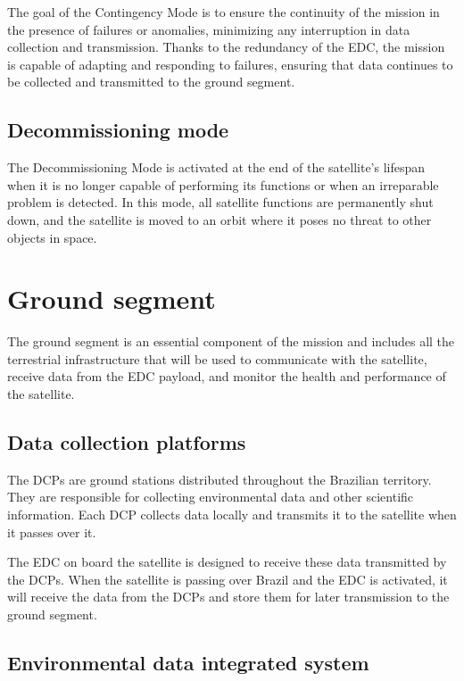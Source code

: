 The goal of the Contingency Mode is to ensure the continuity of the mission in the presence of failures or anomalies, minimizing any interruption in data collection and transmission. Thanks to the redundancy of the EDC, the mission is capable of adapting and responding to failures, ensuring that data continues to be collected and transmitted to the ground segment.

\subsection{Decommissioning mode}

The Decommissioning Mode is activated at the end of the satellite's lifespan when it is no longer capable of performing its functions or when an irreparable problem is detected. In this mode, all satellite functions are permanently shut down, and the satellite is moved to an orbit where it poses no threat to other objects in space.

\section{Ground segment}

The ground segment is an essential component of the mission and includes all the terrestrial infrastructure that will be used to communicate with the satellite, receive data from the EDC payload, and monitor the health and performance of the satellite.

\subsection{Data collection platforms}

The DCPs are ground stations distributed throughout the Brazilian territory. They are responsible for collecting environmental data and other scientific information. Each DCP collects data locally and transmits it to the satellite when it passes over it.

The EDC on board the satellite is designed to receive these data transmitted by the DCPs. When the satellite is passing over Brazil and the EDC is activated, it will receive the data from the DCPs and store them for later transmission to the ground segment.

\subsection{Environmental data integrated system}

